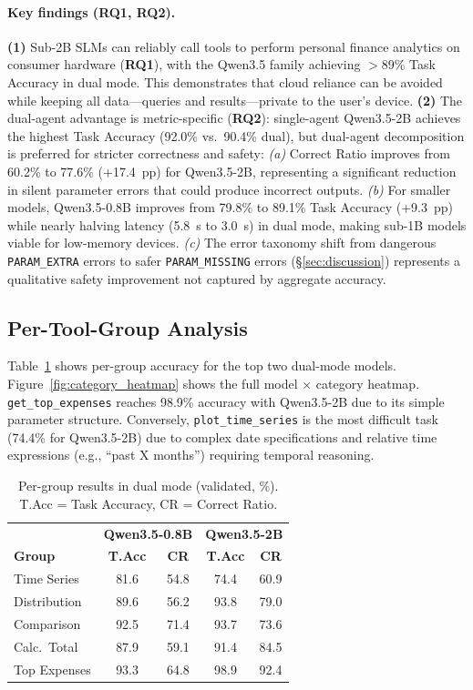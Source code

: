 \documentclass[11pt,twocolumn]{article}
\begin{document}
\paragraph{Key findings (RQ1, RQ2).}
\textbf{(1)} Sub-2B SLMs can reliably call tools to perform personal finance analytics
on consumer hardware (\textbf{RQ1}), with the Qwen3.5 family achieving $>$89\%
Task Accuracy in dual mode.
This demonstrates that cloud reliance can be avoided while keeping
all data---queries and results---private to the user's device.
\textbf{(2)} The dual-agent advantage is metric-specific
(\textbf{RQ2}): single-agent Qwen3.5-2B achieves the highest
Task Accuracy (92.0\% vs.\ 90.4\% dual), but dual-agent decomposition
is preferred for stricter correctness and safety:
\emph{(a)} Correct Ratio improves from 60.2\% to 77.6\% (+17.4~pp)
for Qwen3.5-2B, representing a significant
reduction in silent parameter errors that could produce incorrect outputs.
\emph{(b)} For smaller models, Qwen3.5-0.8B improves from
79.8\% to 89.1\% Task Accuracy (+9.3~pp) while nearly halving latency
(5.8~s to 3.0~s) in dual mode, making sub-1B models viable for
low-memory devices.
\emph{(c)} The error taxonomy shift from dangerous
\texttt{PARAM\_EXTRA} errors to safer \texttt{PARAM\_MISSING}
errors (\S\ref{sec:discussion}) represents a qualitative safety
improvement not captured by aggregate accuracy.

\subsection{Per-Tool-Group Analysis}

Table~\ref{tab:category_results} shows per-group accuracy for the top
two dual-mode models.
Figure~\ref{fig:category_heatmap} shows the full model $\times$
category heatmap.
\texttt{get\_top\_expenses} reaches 98.9\% accuracy with Qwen3.5-2B
due to its simple parameter structure.
Conversely, \texttt{plot\_time\_series} is the most difficult task
(74.4\% for Qwen3.5-2B) due to complex date specifications and
relative time expressions (e.g., ``past X months'') requiring
temporal reasoning.

\begin{table}[t]
\centering
\small
\begin{tabular}{@{}l|cc|cc@{}}
\toprule
& \multicolumn{2}{c|}{\textbf{Qwen3.5-0.8B}} &
  \multicolumn{2}{c}{\textbf{Qwen3.5-2B}} \\
\textbf{Group} & \textbf{T.Acc} & \textbf{CR} &
                 \textbf{T.Acc} & \textbf{CR} \\
\midrule
Time Series  & 81.6 & 54.8 & 74.4 & 60.9 \\
Distribution & 89.6 & 56.2 & 93.8 & 79.0 \\
Comparison   & 92.5 & 71.4 & 93.7 & 73.6 \\
Calc.\ Total & 87.9 & 59.1 & 91.4 & 84.5 \\
Top Expenses & 93.3 & 64.8 & 98.9 & 92.4 \\
\bottomrule
\end{tabular}
\caption{Per-group results in dual mode (validated, \%). T.Acc =
Task Accuracy, CR = Correct Ratio.}
\label{tab:category_results}
\end{table}
\end{document}
